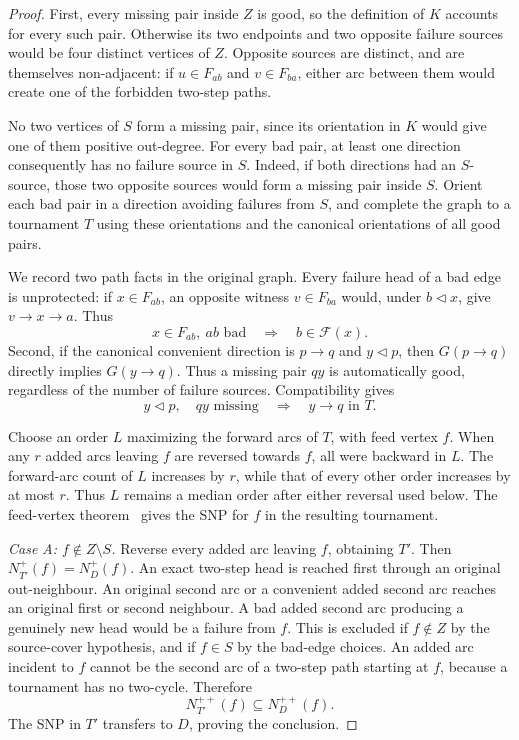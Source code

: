 \begin{proof}
First, every missing pair inside $Z$ is good, so the definition of
$K$ accounts for every such pair. Otherwise its two endpoints and
two opposite failure sources would be four distinct vertices of $Z$.
Opposite sources are distinct, and are themselves non-adjacent: if
$u\in F_{ab}$ and $v\in F_{ba}$, either arc between them would create
one of the forbidden two-step paths.

No two vertices of $S$ form a missing pair, since its orientation in
$K$ would give one of them positive out-degree. For every bad pair,
at least one direction consequently has no failure source in $S$.
Indeed, if both directions had an $S$-source, those two opposite
sources would form a missing pair inside $S$. Orient each bad pair
in a direction avoiding failures from $S$, and complete the graph
to a tournament $T$ using these orientations and the canonical
orientations of all good pairs.

We record two path facts in the original graph. Every failure head
of a bad edge is unprotected: if $x\in F_{ab}$, an opposite witness
$v\in F_{ba}$ would, under $b\triangleleft x$, give $v\to x\to a$.
Thus
\[
 x\in F_{ab},\ ab\text{ bad}\quad\Longrightarrow\quad
 b\in\mathcal F(x).
 \tag{SF2}\label{eq:bad-failure-unprotected}
\]
Second, if the canonical convenient direction is $p\to q$ and
$y\triangleleft p$, then $G(p\to q)$ directly implies $G(y\to q)$.
Thus a missing pair $qy$ is automatically good, regardless of the
number of failure sources. Compatibility gives
\[
 y\triangleleft p,\quad qy\text{ missing}
 \quad\Longrightarrow\quad y\to q\text{ in }T.
 \tag{SF3}\label{eq:small-source-protected-direction}
\]

Choose an order $L$ maximizing the forward arcs of $T$, with feed
vertex $f$. When any $r$ added arcs leaving $f$ are reversed towards
$f$, all were backward in $L$. The forward-arc count of $L$ increases
by $r$, while that of every other order increases by at most $r$.
Thus $L$ remains a median order after either reversal used below.
The feed-vertex theorem~\cite{HavetThomasse2000} gives the SNP for
$f$ in the resulting tournament.

\emph{Case A: $f\notin Z\setminus S$.}
Reverse every added arc leaving $f$, obtaining $T'$. Then
$N_{T'}^+(f)=N_D^+(f)$. An exact two-step head is reached first
through an original out-neighbour. An original second arc or a
convenient added second arc reaches an original first or second
neighbour. A bad added second arc producing a genuinely new head
would be a failure from $f$. This is excluded if $f\notin Z$ by
the source-cover hypothesis, and if $f\in S$ by the bad-edge choices.
An added arc incident to $f$ cannot be the second arc of a two-step
path starting at $f$, because a tournament has no two-cycle.
Therefore
\[
 N_{T'}^{++}(f)\subseteq N_D^{++}(f).
\]
The SNP in $T'$ transfers to $D$, proving the conclusion.


\end{proof}

